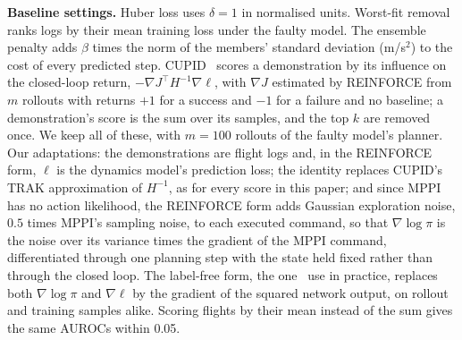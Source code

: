 \documentclass[preprint,12pt]{elsarticle}
\begin{document}
\textbf{Baseline settings.} Huber loss uses $\delta=1$ in normalised units. Worst-fit removal ranks logs by their mean training loss under the faulty model. The ensemble penalty adds $\beta$ times the norm of the members' standard deviation (m/s$^2$) to the cost of every predicted step. CUPID~\citep{agia2025cupid} scores a demonstration by its influence on the closed-loop return, $-\nabla J^\top H^{-1}\nabla\ell$, with $\nabla J$ estimated by REINFORCE from $m$ rollouts with returns $+1$ for a success and $-1$ for a failure and no baseline; a demonstration's score is the sum over its samples, and the top $k$ are removed once. We keep all of these, with $m=100$ rollouts of the faulty model's planner. Our adaptations: the demonstrations are flight logs and, in the REINFORCE form, $\ell$ is the dynamics model's prediction loss; the identity replaces CUPID's TRAK approximation of $H^{-1}$, as for every score in this paper; and since MPPI has no action likelihood, the REINFORCE form adds Gaussian exploration noise, $0.5$ times MPPI's sampling noise, to each executed command, so that $\nabla\log\pi$ is the noise over its variance times the gradient of the MPPI command, differentiated through one planning step with the state held fixed rather than through the closed loop. The label-free form, the one~\citet{agia2025cupid} use in practice, replaces both $\nabla\log\pi$ and $\nabla\ell$ by the gradient of the squared network output, on rollout and training samples alike. Scoring flights by their mean instead of the sum gives the same AUROCs within 0.05.
\end{document}
